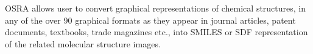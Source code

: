 OSRA allows user to convert graphical representations of chemical structures, in any of the over 90 graphical formats as they appear in journal articles, patent documents, textbooks, trade magazines etc., into SMILES or SDF representation of the related molecular structure images.